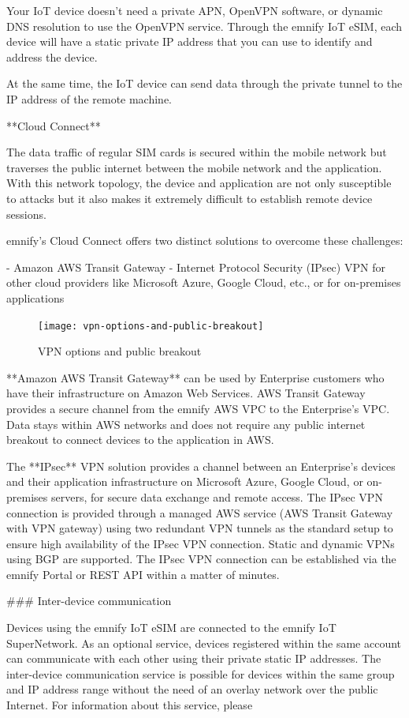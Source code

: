 \documentclass[11pt, oneside]{article}   	%
\newcommand{\addspace}{\vspace{2mm}}
\newcommand{\removespace}{\vspace{-7mm}}
\begin{document}
\begin{markdown}
Your IoT device doesn't need a private APN, OpenVPN software, or dynamic DNS resolution to use the OpenVPN service.
Through the emnify IoT eSIM, each device will have a static private IP address that you can use to identify and address the device.

At the same time, the IoT device can send data through the private tunnel to the IP address of the remote machine.

**Cloud Connect**

The data traffic of regular SIM cards is secured within the mobile network but traverses the public internet between the mobile network and the application.
With this network topology, the device and application are not only susceptible to attacks but it also makes it extremely difficult to establish remote device sessions.

emnify's Cloud Connect offers two distinct solutions to overcome these challenges:

- Amazon AWS Transit Gateway
- Internet Protocol Security (IPsec) VPN for other cloud providers like Microsoft Azure, Google Cloud, etc., or for on-premises applications 

\end{markdown}
\addspace
\begin{figure}[h]
  \texttt{[image: vpn-options-and-public-breakout]}
  \removespace
  \caption{VPN options and public breakout}
\end{figure}
\addspace
\begin{markdown}

  **Amazon AWS Transit Gateway** can be used by Enterprise customers who have their infrastructure on Amazon Web Services.
  AWS Transit Gateway provides a secure channel from the emnify AWS VPC to the Enterprise's VPC.
  Data stays within AWS networks and does not require any public internet breakout to connect devices to the application in AWS.
  
  The **IPsec** VPN solution provides a channel between an Enterprise's devices and their application infrastructure on Microsoft Azure, Google Cloud, or on-premises servers, for secure data exchange and remote access.
  The IPsec VPN connection is provided through a managed AWS service (AWS Transit Gateway with VPN gateway) using two redundant VPN tunnels as the standard setup to ensure high availability of the IPsec VPN connection.
  Static and dynamic VPNs using BGP are supported.
  The IPsec VPN connection can be established via the emnify Portal or REST API within a matter of minutes.

### Inter-device communication

Devices using the emnify IoT eSIM are connected to the emnify IoT SuperNetwork.
As an optional service, devices registered within the same account can communicate with each other using their private static IP addresses.
The inter-device communication service is possible for devices within the same group and IP address range without the need of an overlay network over the public Internet.
For information about this service, please 
\end{markdown}
\end{document}
